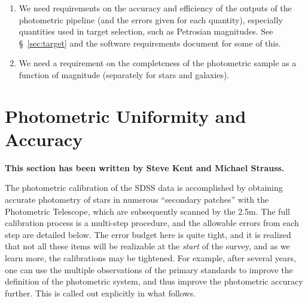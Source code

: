 \begin{enumerate} 
\item We need requirements on the accuracy and efficiency of the outputs of the
photometric pipeline (and the errors given for each quantity),
especially quantities used in target selection, such as Petrosian
magnitudes.   See \S~\ref{sec:target} and the software requirements
document for some of this. 

\item We need a requirement on the completeness of the photometric
sample as a function of magnitude (separately for stars and
galaxies). 
%

\end{enumerate}

\section{Photometric Uniformity and Accuracy}
\label{sec:uniform}
{\bf This section has been written by Steve Kent and Michael Strauss.}

The photometric calibration of the SDSS data is accomplished by
obtaining accurate photometry of stars in numerous ``secondary
patches'' with the Photometric Telescope, which are subsequently
scanned by the 2.5m.  The full calibration process is a multi-step
procedure, and the allowable errors from each step are detailed below.
The error budget here is quite tight, and it is realized that not all
these items will be realizable at the {\em start} of the survey, and
as we learn more, the calibrations may be tightened.  For example,
after several years, one can use the multiple
observations of the primary standards to improve the definition of the
photometric system, and thus improve the photometric accuracy
further.  This is called out explicitly in what follows. 

